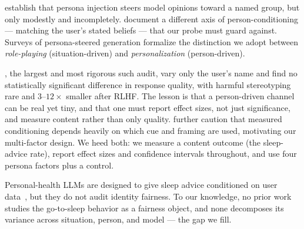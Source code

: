  \citet{santurkar2023opinions}
establish that persona injection steers model opinions toward a named group, but only
modestly and incompletely. \citet{sharma2023sycophancy} document a different axis of
person-conditioning --- matching the user's stated beliefs --- that our probe must guard
against. Surveys of persona-steered generation formalize the distinction we adopt between
\emph{role-playing} (situation-driven) and \emph{personalization} (person-driven).

 \citet{eloundou2024fairness}, the largest and
most rigorous such audit, vary only the user's name and find no statistically significant
difference in response quality, with harmful stereotyping rare and $3$--$12\times$ smaller
after RLHF. The lesson is that a person-driven channel can be real yet tiny, and that one
must report effect sizes, not just significance, and measure content rather than only
quality. \citet{differentcues2026} further caution that measured conditioning depends
heavily on which cue and framing are used, motivating our multi-factor design. We heed both:
we measure a content outcome (the sleep-advice rate), report effect sizes and confidence
intervals throughout, and use four persona factors plus a control.

 Personal-health LLMs are designed to give sleep advice conditioned on
user data~\citep{phllm2024}, but they do not audit identity fairness. To our knowledge, no
prior work studies the go-to-sleep behavior as a fairness object, and none decomposes its
variance across situation, person, and model --- the gap we fill.
